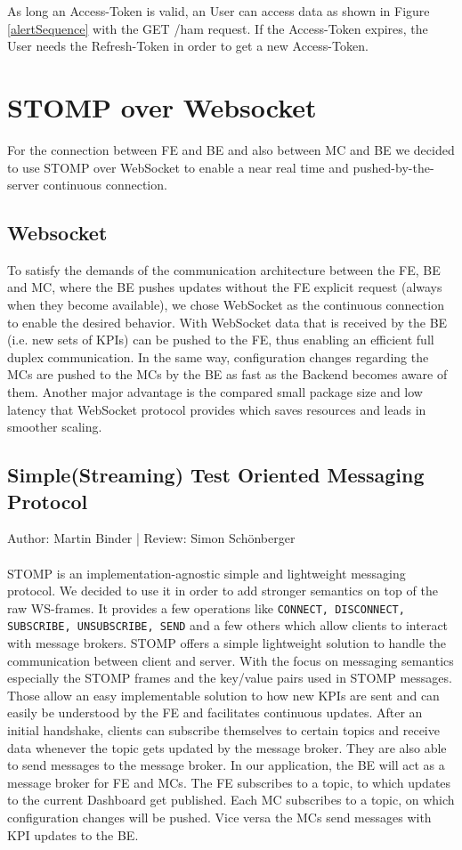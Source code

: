 \documentclass{scrreprt}
\begin{document}
\noindent As long an Access-Token is valid, an User can access data as shown in Figure \ref{alertSequence} with the GET /ham request. If the Access-Token expires, the User needs the Refresh-Token in order to get a new Access-Token.


\section{STOMP over Websocket} \label{websockets}
For the connection between FE and BE and also between MC and BE we decided to use STOMP over WebSocket to enable a near real time and  pushed-by-the-server continuous connection.
\subsection{Websocket}
To satisfy the demands of the communication architecture between the FE, BE and MC, where the BE pushes updates without the FE explicit request (always when they become available), we chose WebSocket as the continuous connection to enable the desired behavior. With WebSocket data that is received by the BE (i.e. new sets of KPIs) can be pushed to the FE, thus enabling an efficient full duplex communication. In the same way, configuration changes regarding the MCs are pushed to the MCs by the BE as fast as the Backend becomes aware of them. Another major advantage is the compared small package size and low latency that WebSocket protocol provides which saves resources and leads in smoother scaling.
\subsection{Simple(Streaming) Test Oriented Messaging Protocol}
Author: Martin Binder | Review: Simon Schönberger\\ \\
STOMP is an implementation-agnostic simple and lightweight messaging protocol. We decided
to use it in order to add stronger semantics on top of the raw WS-frames. It provides a few
operations like \texttt{CONNECT, DISCONNECT, SUBSCRIBE, UNSUBSCRIBE, SEND} and a few others
which allow clients to interact with message brokers.
STOMP offers a simple lightweight solution to handle the communication between client and server. With the focus on messaging semantics especially the STOMP frames and the key/value pairs used in STOMP messages. Those allow an easy implementable solution to how new KPIs are sent and can easily be understood by the FE and facilitates continuous updates.
After an initial handshake, clients can subscribe themselves to certain topics and
receive data whenever the topic gets updated by the message broker. They are also able to
send messages to the message broker.
In our application, the BE will act as a message broker for FE and MCs. The FE subscribes to
a topic, to which updates to the current Dashboard get published. Each MC subscribes to
a topic, on which configuration changes will be pushed. Vice versa the MCs send messages
with KPI updates to the BE.
\end{document}
